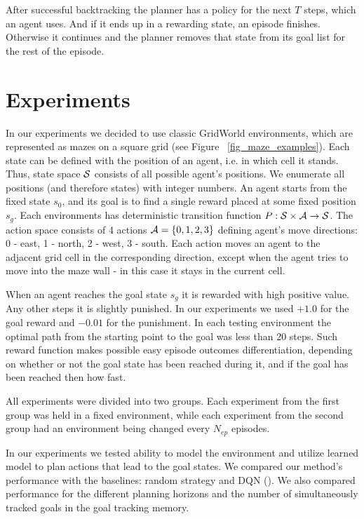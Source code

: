 \documentclass[runningheads]{llncs}
\begin{document}
After successful backtracking the planner has a policy for the next $T$ steps, which an agent uses. And if it ends up in a rewarding state, an episode finishes. Otherwise it continues and the planner removes that state from its goal list for the rest of the episode.

\section{Experiments}

In our experiments we decided to use classic GridWorld environments, which are represented as mazes on a square grid (see Figure ~\ref{fig_maze_examples}). Each state can be defined with the position of an agent, i.e. in which cell it stands. Thus, state space $\mathcal{S}$ consists of all possible agent's positions. We enumerate all positions (and therefore states) with integer numbers. An agent starts from the fixed state $s_0$, and its goal is to find a single reward placed at some fixed position $s_g$. Each environments has deterministic transition function $P: \mathcal{S} \times \mathcal{A} \rightarrow \mathcal{S}$. The action space consists of 4 actions $\mathcal{A} = \{ 0, 1, 2, 3 \}$ defining agent's move directions: 0 - east, 1 - north, 2 - west, 3 - south. Each action moves an agent to the adjacent grid cell in the corresponding direction, except when the agent tries to move into the maze wall - in this case it stays in the current cell.

When an agent reaches the goal state $s_g$ it is rewarded with high positive value. Any other steps it is slightly punished. In our experiments we used $+1.0$ for the goal reward and $-0.01$ for the punishment. In each testing environment the optimal path from the starting point to the goal was less than 20 steps. Such reward function makes possible easy episode outcomes differentiation, depending on whether or not the goal state has been reached during it, and if the goal has been reached then how fast.

All experiments were divided into two groups. Each experiment from the first group was held in a fixed environment, while each experiment from the second group had an environment being changed every $N_{ep}$ episodes.

In our experiments we tested ability to model the environment and utilize learned model to plan actions that lead to the goal states. We compared our method's performance with the baselines: random strategy and DQN (\cite{Mnih_2015_Atari}). We also compared performance for the different planning horizons and the number of simultaneously tracked goals in the goal tracking memory.
\end{document}
